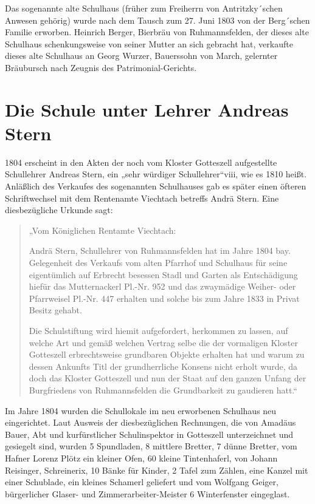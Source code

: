 \documentclass[12pt,a4paper]{book}
\begin{document}
Das sogenannte alte Schulhaus (früher zum Freiherrn von Antritzky´schen Anwesen
gehörig) wurde nach dem Tausch zum 27. Juni 1803 von der Berg´schen Familie
erworben. Heinrich Berger, Bierbräu von Ruhmannsfelden, der dieses alte
Schulhaus schenkungsweise von seiner Mutter an sich gebracht hat, verkaufte
dieses alte Schulhaus an Georg Wurzer, Bauerssohn von March, gelernter
Bräubursch nach Zeugnis des Patrimonial-Gerichts.

\section{Die Schule unter Lehrer Andreas Stern}

1804 erscheint in den Akten der noch vom Kloster Gotteszell aufgestellte
Schullehrer Andreas Stern, ein „sehr würdiger Schullehrer“viii, wie es 1810
heißt. Anläßlich des Verkaufes des sogenannten Schulhauses gab es später einen
öfteren Schriftwechsel mit dem Rentenamte Viechtach betreffs Andrä Stern. Eine
diesbezügliche Urkunde sagt:

\begin{quote}
„Vom Königlichen Rentamte Viechtach:

Andrä Stern, Schullehrer von Ruhmannsfelden hat im Jahre 1804 bay. Gelegenheit
des Verkaufs vom alten Pfarrhof und Schulhaus für seine eigentümlich auf
Erbrecht besessen Stadl und Garten als Entschädigung hiefür das Mutternackerl
Pl.-Nr. 952 und das zwaymädige Weiher- oder Pfarrweisel Pl.-Nr. 447 erhalten und
solche bis zum Jahre 1833 in Privat Besitz gehabt.

Die Schulstiftung wird hiemit aufgefordert, herkommen zu lassen, auf welche Art
und gemäß welchen Vertrag selbe die der vormaligen Kloster Gotteszell
erbrechtsweise grundbaren Objekte erhalten hat und warum zu dessen Ankunfts Titl
der grundherrliche Konsens nicht erholt wurde, da doch das Kloster Gotteszell
und nun der Staat auf den ganzen Unfang der Burgfriedens von Ruhmannsfelden die
Grundbarkeit zu gaudieren hatt.“
\end{quote}

Im Jahre 1804 wurden die Schullokale im neu erworbenen Schulhaus neu
eingerichtet. Laut Ausweis der diesbezüglichen Rechnungen, die von Amadäus
Bauer, Abt und kurfürstlicher Schulinspektor in Gotteszell unterzeichnet und
gesiegelt sind, wurden 5 Spundladen, 8 mittlere Bretter, 7 dünne Bretter, vom
Hafner Lorenz Plötz ein kleiner Ofen, 60 kleine Tintenhaferl, von Johann
Reisinger, Schreinerix, 10 Bänke für Kinder, 2 Tafel zum Zählen, eine Kanzel mit
einer Schublade, ein kleines Schamerl geliefert und vom Wolfgang Geiger,
bürgerlicher Glaser- und Zimmerarbeiter-Meister 6 Winterfenster eingeglast.
\end{document}
